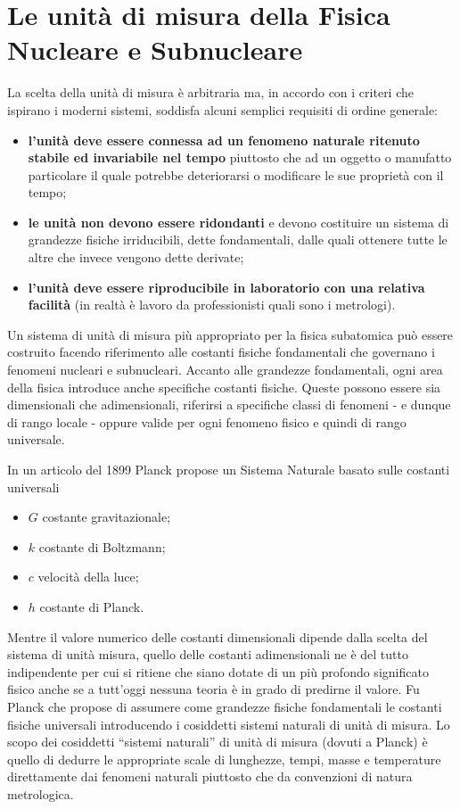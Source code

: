 
\section{Le unità di misura della Fisica Nucleare e Subnucleare}
\label{sec:unita-di-misura}

La scelta della unità di misura è arbitraria ma, in accordo con i criteri che ispirano i moderni sistemi, soddisfa
alcuni semplici requisiti di ordine generale:
\begin{itemize}
    \item  \textbf{l'unità deve essere connessa ad un fenomeno naturale ritenuto stabile ed invariabile nel tempo} piuttosto che ad un oggetto o manufatto particolare il quale potrebbe deteriorarsi o modificare le sue proprietà con il tempo;
    \item  \textbf{le unità non devono essere ridondanti} e devono costituire un sistema di grandezze fisiche irriducibili, dette fondamentali, dalle quali ottenere tutte le altre che invece vengono dette derivate;
    \item  \textbf{l'unità deve essere riproducibile in laboratorio con una relativa facilità} (in realtà è lavoro da professionisti quali sono i metrologi).
\end{itemize}

Un sistema di unità di misura più appropriato per la fisica subatomica può essere costruito facendo riferimento alle costanti fisiche fondamentali che governano i fenomeni nucleari e subnucleari.
Accanto alle grandezze fondamentali, ogni area della fisica introduce anche specifiche costanti fisiche.
Queste possono essere sia dimensionali che adimensionali, riferirsi a specifiche classi di fenomeni - e dunque di rango locale - oppure valide per ogni fenomeno fisico e quindi di rango universale.
\marginnote
{
In un articolo del 1899 Planck propose un Sistema Naturale basato sulle costanti universali
    \begin{itemize}
        \item $ G$ costante gravitazionale;
        \item $ k$ costante di Boltzmann;
        \item $ c$ velocità della luce;
        \item $ h$ costante di Planck.
    \end{itemize}
}

Mentre il valore numerico delle costanti dimensionali dipende dalla scelta del sistema di unità misura, quello delle
costanti adimensionali ne è del tutto indipendente per cui si ritiene che siano dotate di un più profondo significato
fisico anche se a tutt’oggi nessuna teoria è in grado di predirne il valore.
Fu Planck che propose di assumere come grandezze fisiche fondamentali le costanti fisiche universali introducendo i
cosiddetti sistemi naturali di unità di misura.
Lo scopo dei cosiddetti ``sistemi naturali'' di unità di misura (dovuti a Planck) è quello di dedurre le appropriate scale di lunghezze, tempi, masse e temperature direttamente
dai fenomeni naturali piuttosto che da convenzioni di natura metrologica.

